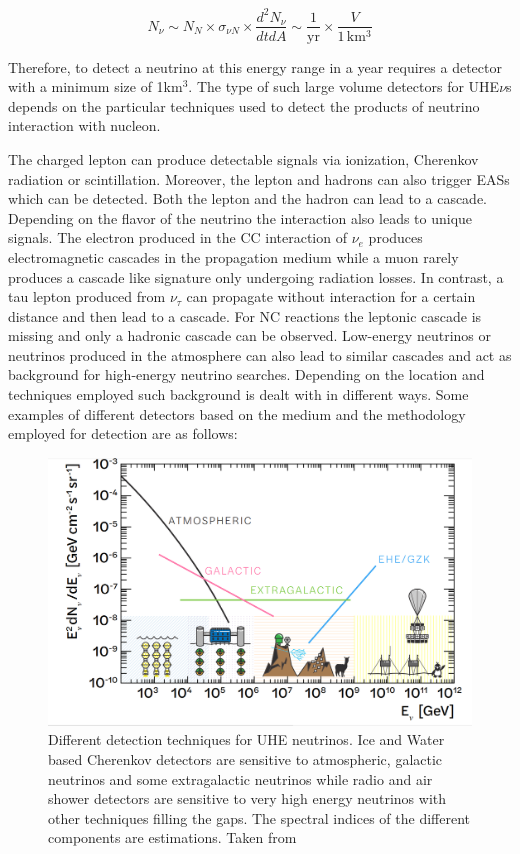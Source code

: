 \begin{equation}
  N_{\nu} \sim N_N \times \sigma_{\nu N} \times \frac{d^2N_{\nu}}{dt dA} \sim \frac{1}{\text{yr}} \times \frac{V}{1\,\mathrm{km^3}}
\end{equation}

Therefore, to detect a neutrino at this energy range in a year requires a detector with a minimum size of 1km$^3$. The type of such large volume detectors for UHE$\nu$s depends on the particular techniques used to detect the products of neutrino interaction with nucleon. 


The charged lepton can produce detectable signals via ionization, Cherenkov radiation or scintillation. Moreover, the lepton and hadrons can also trigger EASs which can be detected. Both the lepton and the hadron can lead to a cascade. Depending on the flavor of the neutrino the interaction also leads to unique signals. The electron produced in the CC interaction of $\nu_e$ produces electromagnetic cascades in the propagation medium while a muon rarely produces a cascade like signature only undergoing radiation losses. In contrast, a tau lepton produced from $\nu_{\tau}$ can propagate without interaction for a certain distance and then lead to a cascade. For NC reactions the leptonic cascade is missing and only a hadronic cascade can be observed. Low-energy neutrinos or neutrinos produced in the atmosphere can also lead to similar cascades and act as background for high-energy neutrino searches. Depending on the location and techniques employed such background is dealt with in different ways. Some examples of different detectors based on the medium and the methodology employed for detection are as follows:

\begin{figure}[t!]
  \centering
  \includegraphics[width=14.5cm]{thesis_figures/CRnNu/UHE_nu_techniques.png}
  \caption{Different detection techniques for UHE neutrinos. Ice and Water based Cherenkov detectors are sensitive to atmospheric, galactic neutrinos and some extragalactic neutrinos while radio and air shower detectors are sensitive to very high energy neutrinos with other techniques filling the gaps. The spectral indices of the different components are estimations. Taken from~\cite{Arguelles:2024xkx}}
  \label{fig:UHE-nu-techniques}
\end{figure}

